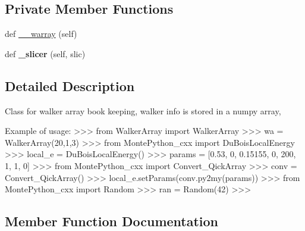 \subsection*{Private Member Functions}
\begin{DoxyCompactItemize}
\item 
def \hyperlink{classWalkerArray_1_1WalkerArray_a9e48bf157c1d659ef4ed5318ceda738c}{\+\_\+\+\_\+warray} (self)
\item 
\hypertarget{classWalkerArray_1_1WalkerArray_aef04874770ad4b26ea8b282c8ecf5bcc}{}def {\bfseries \+\_\+slicer} (self, slic)\label{classWalkerArray_1_1WalkerArray_aef04874770ad4b26ea8b282c8ecf5bcc}

\end{DoxyCompactItemize}


\subsection{Detailed Description}
\begin{DoxyVerb}Class for walker array book keeping,
walker info is stored in a numpy array,

Example of usage:
>>> from WalkerArray import WalkerArray
>>> wa = WalkerArray(20,1,3)
>>> from MontePython_cxx import DuBoisLocalEnergy
>>> local_e = DuBoisLocalEnergy()
>>> params = [0.53, 0, 0.15155, 0, 200, 1, 1, 0]
>>> from MontePython_cxx import Convert_QickArray
>>> conv = Convert_QickArray()
>>> local_e.setParams(conv.py2my(params))
>>> from MontePython_cxx import Random
>>> ran = Random(42)
>>>
\end{DoxyVerb}
 

\subsection{Member Function Documentation}
\hypertarget{classWalkerArray_1_1WalkerArray_aad8362e7b5a2d09f8d56d6891b83dc0b}{}
